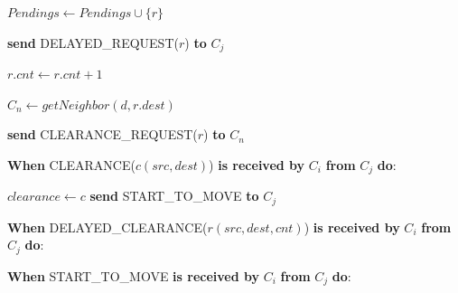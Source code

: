 {{		 {
			\label{alg:reconfiguration:c2sr:line:delayed-clearance-in-start}	
			$Pendings \gets Pendings \cup \{r\}$\; 	
			\Return\;				
		} 
		\label{alg:reconfiguration:c2sr:line:delayed-clearance-in-end}	
		
		 {
			
			 {
				\label{alg:reconfiguration:c2sr:line:delayed-clearance-out2-start}
				{\bf send} DELAYED\_REQUEST($r$) {\bf to} $C_j$\;
				\Return\;
			}
			\label{alg:reconfiguration:c2sr:line:delayed-clearance-out2-end}
			
			$r.cnt \gets r.cnt + 1$\;
		}
		
		$C_n \gets getNeighbor(d,r.dest)$\;
		
		 {
			{\bf send} CLEARANCE\_REQUEST($r$) {\bf to} $C_n$\;
		} 
		\label{alg:reconfiguration:c2sr:line:clearance-granted-1-end}
		\label{alg:reconfiguration:c2sr:line:check-clearance-end}
		
		\BlankLine
		\BlankLine
		

}{

		\setcounter{AlgoLine}{19}
		{\bf When} CLEARANCE($c(src,dest)$) {\bf is received by} ${C_i}$
		{\bf from} ${C_j}$ {\bf do}:
		
		\label{alg:reconfiguration:c2sr:line:clearance-forward-start}	
		 {
			$clearance \gets c$\;
			{\bf send} START\_TO\_MOVE {\bf to} $C_j$\;
		} 
		\label{alg:reconfiguration:c2sr:line:clearance-forward-end}	
		
		\BlankLine
		\BlankLine
		
		{\bf When} DELAYED\_CLEARANCE($r(src,dest,cnt)$) {\bf is received by} ${C_i}$
		{\bf from} ${C_j}$ {\bf do}:
		
		\label{alg:reconfiguration:c2sr:line:delayed-clearance-msg-start}
		\label{alg:reconfiguration:c2sr:line:delayed-clearance-msg-end}	
		
		\BlankLine
		\BlankLine
		
		{\bf When} START\_TO\_MOVE {\bf is received by} ${C_i}$
		{\bf from} ${C_j}$ {\bf do}:
		\label{alg:reconfiguration:c2sr:line:start-move-and-ack-start}
		
}}
